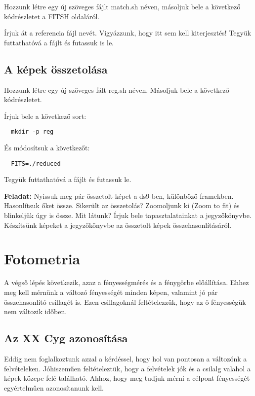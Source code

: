 \documentclass{article}
\begin{document}
Hozzunk létre egy új szöveges fájlt match.sh néven, másoljuk bele a következő
kódrészletet a FITSH oldaláról.

Írjuk át a referencia fájl nevét. Vigyázzunk, hogy itt sem kell kiterjesztés!
Tegyük futtathatóvá a fájlt és futassuk is le.

\subsection{A képek összetolása}

Hozzunk létre egy új szöveges fált reg.sh néven. Másoljuk bele a következő
kódrészletet.

Írjuk bele a következő sort:
\begin{verbatim}
  mkdir -p reg
\end{verbatim}

És módosítsuk a következőt:

\begin{verbatim}
  FITS=./reduced
\end{verbatim}

Tegyük futtathatóvá a fájlt és futassuk le.

{\bf Feladat:}
Nyissuk meg pár összetolt képet a ds9-ben, különböző framekben. Hasonlítsuk
őket össze. Sikerült az összetolás? Zoomoljunk ki (Zoom to fit) és blinkeljük
úgy is össze. Mit látunk? Írjuk bele tapasztalatainkat a jegyzőkönyvbe.
Készítsünk képeket a jegyzőkönyvbe az összetolt képek összehasonlításáról.

\section{Fotometria}

A végső lépés következik, azaz a fényességmérés és a fénygörbe előállítása.
Ehhez meg kell mérnünk a változó fényességét minden képen, valamint jó pár
összehasonlító csillagét is. Ezen csillagoknál feltételezzük, hogy az ő
fényességük nem változik időben.

\subsection{Az XX Cyg azonosítása}

Eddig nem foglalkoztunk azzal a kérdéssel, hogy hol van pontosan a változónk a
felvételeken. Jóhiszeműen feltételeztük, hogy a felvételek jók és a csilalg
valahol a képek közepe felé található. Ahhoz, hogy meg tudjuk mérni a célpont
fényességét egyértelműen azonosítanunk kell.
\end{document}
